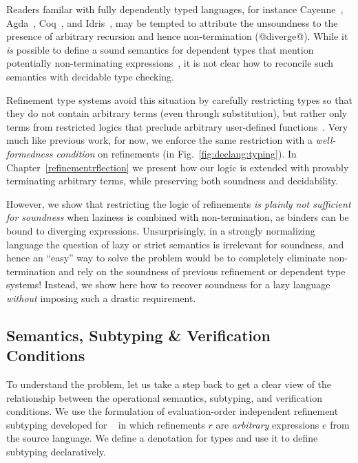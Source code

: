  Readers familar 
with fully dependently typed languages, for instance 
Cayenne~\cite{cayenne}, Agda~\cite{agda}, 
Coq~\cite{coq-book}, and Idris~\cite{Brady13}, may be
tempted to attribute the unsoundness to the presence 
of arbitrary recursion and hence non-termination 
(\eg @diverge@).
While it \emph{is} possible to define a sound semantics 
for dependent types that mention potentially non-terminating
expressions~\citep{Knowles10}, it is not clear how to reconcile
such semantics with decidable type checking. 

Refinement type systems avoid this situation by carefully restricting 
types so that they do not contain arbitrary terms (even through 
substitution), but rather only terms from restricted logics that
preclude arbitrary user-defined functions~\cite{pfenningxi98,Dunfield07,fstar}.
Very much like previous work, for now, we enforce the same restriction
with a \emph{well-formedness condition} on 
refinements (\rwbased in Fig.~\ref{fig:declang:typing}).
%
In Chapter~\ref{refinementrflection} we present how 
our logic is extended with provably terminating arbitrary terms, 
while preserving both soundness and decidability.

However, we show that restricting the logic of refinements
\emph{is plainly not sufficient for soundness} 
when laziness is combined with non-termination, 
as binders can be bound to diverging expressions. 
Unsurprisingly, in a strongly
normalizing language the question of lazy or strict semantics is irrelevant for soundness, and hence 
an ``easy'' way to solve the problem would be to completely eliminate non-termination and rely on the soundness
of previous refinement or dependent type systems! Instead, we show here how to 
recover soundness for a lazy language \emph{without} imposing such a drastic requirement. 


\subsection{Semantics, Subtyping \& Verification Conditions} \label{sec:den-sem}

To understand the problem, let us take a step 
back to get a clear view of the relationship 
between the operational semantics, subtyping,
and verification conditions.
%
We use the formulation of evaluation-order 
independent refinement subtyping developed 
for \hlang~\cite{Knowles10} in which 
refinements $r$ are \emph{arbitrary} expressions $e$ from the source language.
We define a denotation for types and use it 
to define subtyping declaratively.

